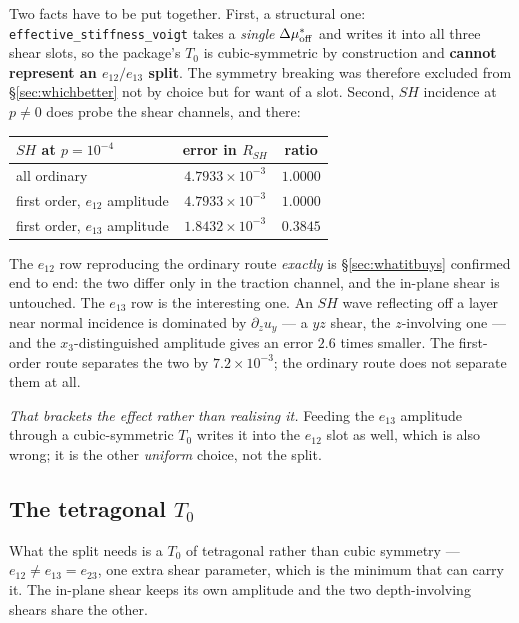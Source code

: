 \documentclass[11pt,a4paper]{article}
\begin{document}
Two facts have to be put together.  First, a structural one:
\texttt{effective\_stiffness\_voigt} takes a \emph{single} $\Delta\mu^{*}_{\rm
off}$ and writes it into all three shear slots, so the package's $T_0$ is
cubic-symmetric by construction and \textbf{cannot represent an
$e_{12}/e_{13}$ split}.  The symmetry breaking was therefore excluded from
\S\ref{sec:whichbetter} not by choice but for want of a slot.  Second, $SH$
incidence at $p\neq0$ does probe the shear channels, and there:
\begin{center}
\begin{tabular}{lcc}
\toprule
$SH$ at $p = 10^{-4}$ & error in $R_{SH}$ & ratio\\
\midrule
all ordinary                     & $4.7933\times10^{-3}$ & $1.0000$\\
first order, $e_{12}$ amplitude  & $4.7933\times10^{-3}$ & $1.0000$\\
first order, $e_{13}$ amplitude  & $1.8432\times10^{-3}$ & $\mathbf{0.3845}$\\
\bottomrule
\end{tabular}
\end{center}
The $e_{12}$ row reproducing the ordinary route \emph{exactly} is
\S\ref{sec:whatitbuys} confirmed end to end: the two differ only in the traction
channel, and the in-plane shear is untouched.  The $e_{13}$ row is the
interesting one.  An $SH$ wave reflecting off a layer near normal incidence is
dominated by $\partial_z u_y$ --- a $yz$ shear, the $z$-involving one --- and the
$x_3$-distinguished amplitude gives an error $2.6$ times smaller.  The
first-order route separates the two by $7.2\times10^{-3}$; the ordinary route
does not separate them at all.

\emph{That brackets the effect rather than realising it.}  Feeding the $e_{13}$
amplitude through a cubic-symmetric $T_0$ writes it into the $e_{12}$ slot as
well, which is also wrong; it is the other \emph{uniform} choice, not the split.

\subsection{The tetragonal \texorpdfstring{$T_0$}{T0}}\label{sec:tetragonal}

What the split needs is a $T_0$ of tetragonal rather than cubic symmetry ---
$e_{12} \neq e_{13} = e_{23}$, one extra shear parameter, which is the minimum
that can carry it.  The in-plane shear keeps its own amplitude and the two
depth-involving shears share the other.
\end{document}
